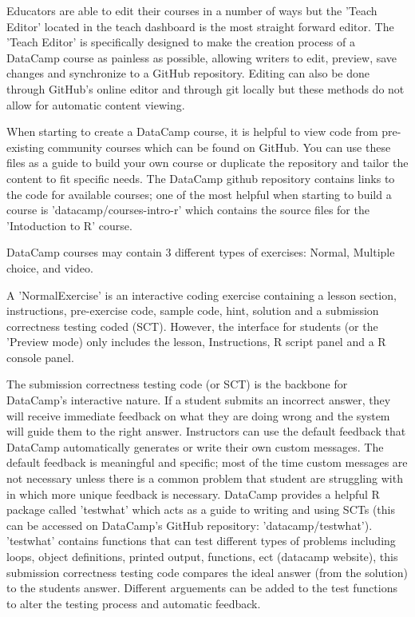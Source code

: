 \documentclass[12pt]{article}
\begin{document}
Educators are able to edit their courses in a number of ways but the 'Teach Editor' located in the teach dashboard is the
most straight forward editor. The 'Teach Editor' is specifically designed to make the creation process of a DataCamp course
as painless as possible, allowing writers to edit, preview, save changes and synchronize to a GitHub repository. Editing can
also be done through GitHub's online editor and through git locally but these methods do not allow for automatic content
viewing.

When starting to create a DataCamp course, it is helpful to view code from pre-existing community courses which can be found on GitHub.
You can use these files as a guide to build your own course or duplicate the repository and tailor the content to fit specific needs.
The DataCamp github repository contains links to the code for available courses; one of the most helpful when starting to build a course 
is 'datacamp/courses-intro-r' which contains the source files for the 'Intoduction to R' course.


DataCamp courses may contain 3 different types of exercises: Normal, Multiple choice, and video.

A 'NormalExercise' is an interactive coding exercise containing a lesson section, instructions, pre-exercise code, sample
code, hint, solution and a submission correctness testing coded (SCT). However, the interface for students (or the 'Preview
mode) only includes the lesson, Instructions, R script panel and a R console panel.


The submission correctness testing code (or SCT) is the backbone for DataCamp's interactive nature. If a student submits an incorrect answer, they will 
receive immediate feedback on what they are doing wrong and the system will guide them to the right answer. Instructors can use the default feedback
that DataCamp automatically generates or write their own custom messages. The default feedback is meaningful and specific; most of the time custom 
messages are not necessary unless there is a common problem that student are struggling with in which more unique feedback is necessary. 
DataCamp provides a helpful R package called 'testwhat' which acts as a guide to writing and using SCTs (this can be accessed on DataCamp's GitHub 
repository: 'datacamp/testwhat'). 
'testwhat' contains functions that can test different types of problems including loops, object definitions, printed output, functions, ect 
(datacamp website), this submission correctness testing code compares the ideal answer (from the solution) to the students answer. Different
arguements can be added to the test functions to alter the testing process and automatic feedback.
\end{document}
